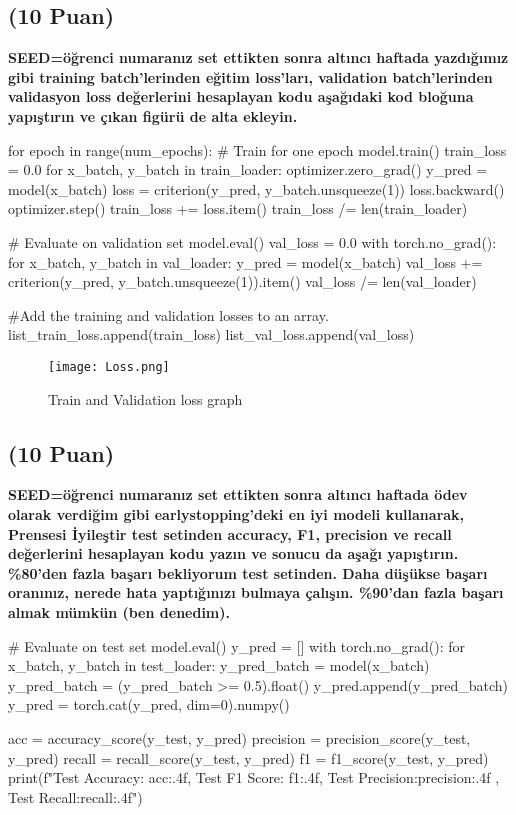 \documentclass[11pt]{article}
\begin{document}
\subsection{(10 Puan)} \textbf{SEED=öğrenci numaranız set ettikten sonra altıncı haftada yazdığımız gibi training batch'lerinden eğitim loss'ları, validation batch'lerinden validasyon loss değerlerini hesaplayan kodu aşağıdaki kod bloğuna yapıştırın ve çıkan figürü de alta ekleyin.}

\begin{python}
    for epoch in range(num_epochs):
        # Train for one epoch
        model.train()
        train_loss = 0.0
        for x_batch, y_batch in train_loader:
            optimizer.zero_grad()
            y_pred = model(x_batch)
            loss = criterion(y_pred, y_batch.unsqueeze(1))
            loss.backward()
            optimizer.step()
            train_loss += loss.item()
        train_loss /= len(train_loader)

        # Evaluate on validation set
        model.eval()
        val_loss = 0.0
        with torch.no_grad():
            for x_batch, y_batch in val_loader:
                y_pred = model(x_batch)
                val_loss += criterion(y_pred, y_batch.unsqueeze(1)).item()
            val_loss /= len(val_loader)
        
        #Add the training and validation losses to an array.
        list_train_loss.append(train_loss)
        list_val_loss.append(val_loss)
\end{python}

\begin{figure}[ht!]
    \centering
    \texttt{[image: Loss.png]}
    \caption{Train and Validation loss graph}
    \label{fig:my_pic}
\end{figure}

\newpage
\subsection{(10 Puan)} \textbf{SEED=öğrenci numaranız set ettikten sonra altıncı haftada ödev olarak verdiğim gibi earlystopping'deki en iyi modeli kullanarak, Prensesi İyileştir test setinden accuracy, F1, precision ve recall değerlerini hesaplayan kodu yazın ve sonucu da aşağı yapıştırın. \%80'den fazla başarı bekliyorum test setinden. Daha düşükse başarı oranınız, nerede hata yaptığınızı bulmaya çalışın. \%90'dan fazla başarı almak mümkün (ben denedim).}

\begin{python}
# Evaluate on test set
model.eval()
y_pred = []
with torch.no_grad():
    for x_batch, y_batch in test_loader:
        y_pred_batch = model(x_batch)
        y_pred_batch = (y_pred_batch >= 0.5).float()
        y_pred.append(y_pred_batch)
y_pred = torch.cat(y_pred, dim=0).numpy()

acc = accuracy_score(y_test, y_pred)
precision = precision_score(y_test, y_pred)
recall = recall_score(y_test, y_pred)
f1 = f1_score(y_test, y_pred)
print(f"Test Accuracy: {acc:.4f}, Test F1 Score: {f1:.4f}, Test Precision:{precision:.4f} , Test Recall:{recall:.4f}")
\end{python}
\end{document}
